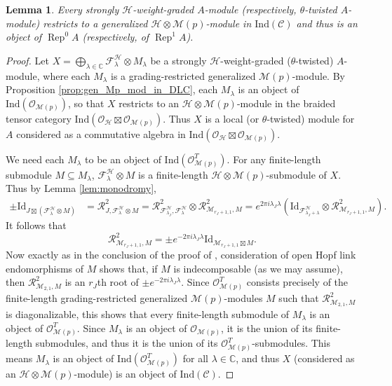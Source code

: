 \documentclass[11pt, reqno]{amsart}
\newtheorem{lem}[thm]{Lemma}
\theoremstyle{definition}\newtheorem{defi}[thm]{Definition}
\theoremstyle{definition}\newtheorem{rem}[thm]{Remark}
\theoremstyle{definition}\newtheorem{exam}[thm]{Example}
\theoremstyle{definition}\newtheorem{assum}[thm]{Assumption}
\newcommand{\cH}{\mathcal{H}}
\newcommand{\cR}{\mathcal{R}}
\newcommand{\cM}{\mathcal{M}}
\newcommand{\cF}{\mathcal{F}}
\newcommand{\cO}{\mathcal{O}}
\newcommand{\cC}{\mathcal{C}}
\newcommand{\CC}{\mathbb{C}}
\newcommand{\Id}{\mathrm{Id}}
\newcommand{\tens}{\boxtimes}
\newcommand{\ind}{\mathrm{Ind}}
\DeclareMathOperator{\rep}{Rep}
\begin{document}
\begin{lem}\label{lem:Bp_mod_in_ind_C}
 Every strongly $\cH$-weight-graded $A$-module (respectively, $\theta$-twisted $A$-module) restricts to a generalized $\cH\otimes\cM(p)$-module in $\ind(\cC)$ and thus is an object of $\rep^0A$ (respectively, of $\rep^1A$).
\end{lem}
\begin{proof}
 Let $X=\bigoplus_{\lambda\in\CC} \cF^\cH_\lambda\otimes M_\lambda$ be a strongly $\cH$-weight-graded ($\theta$-twisted) $A$-module, where each $M_\lambda$ is a grading-restricted generalized $\cM(p)$-module. By Proposition \ref{prop:gen_Mp_mod_in_DLC}, each $M_\lambda$ is an object of $\ind(\cO_{\cM(p)})$, so that $X$ restricts to an $\cH\otimes\cM(p)$-module in the braided tensor category $\ind(\cO_\cH\tens\cO_{\cM(p)})$. Thus $X$ is a local (or $\theta$-twisted) module for $A$ considered as a commutative algebra in $\ind(\cO_\cH\tens\cO_{\cM(p)})$.
 
 
 We need each $M_\lambda$ to be an object of $\ind(\cO_{\cM(p)}^T)$. For any finite-length submodule $M\subseteq M_\lambda$, $\cF^\cH_\lambda\otimes M$ is a finite-length $\cH\otimes\cM(p)$-submodule of $X$. Thus by Lemma \ref{lem:monodromy},
 \begin{align*}
  \pm\Id_{J\tens(\cF^\cH_\lambda\otimes M)} &=\cR^2_{J,\cF^\cH_\lambda\otimes M}=\cR^2_{\cF^\cH_{\lambda_J}, \cF^\cH_\lambda}\otimes\cR^2_{\cM_{r_J+1,1},M} = e^{2\pi i\lambda_J\lambda}(\Id_{\cF^\cH_{\lambda_J+\lambda}}\otimes\cR^2_{\cM_{r_J+1,1},M}).
 \end{align*}
It follows that
\begin{equation*}
 \cR^2_{\cM_{r_J+1,1},M}=\pm e^{-2\pi i\lambda_J\lambda}\Id_{\cM_{r_J+1,1}\tens M}.
\end{equation*}
Now exactly as in the conclusion of the proof of \cite[Proposition 6.4]{CMY-singlet-typical}, consideration of open Hopf link endomorphisms of $M$ shows that, if $M$ is indecomposable (as we may assume), then $\cR_{\cM_{2,1},M}^2$ is an $r_J$th root of $\pm e^{-2\pi i\lambda_J\lambda}$. Since $\cO_{\cM(p)}^T$ consists precisely of the finite-length grading-restricted generalized $\cM(p)$-modules $M$ such that $\cR_{\cM_{2,1},M}^2$ is diagonalizable, this shows that every finite-length submodule of $M_\lambda$ is an object of $\cO_{\cM(p)}^T$. Since $M_\lambda$ is an object of $\cO_{\cM(p)}$, it is the union of its finite-length submodules, and thus it is the union of its $\cO_{\cM(p)}^T$-submodules. This means $M_\lambda$ is an object of $\ind(\cO_{\cM(p)}^T)$ for all $\lambda\in\CC$, and thus $X$ (considered as an $\cH\otimes\cM(p)$-module) is an object of $\ind(\cC)$.
\end{proof}
\end{document}
